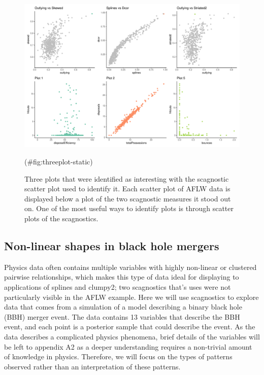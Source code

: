 \begin{Schunk}
\begin{figure}

{\centering \includegraphics[width=1\linewidth]{mason-lee-laa-cook_files/figure-latex/threeplot-static-1} 

}

\caption[Three plots that were identified as interesting with the scagnostic scatter plot used to identify it]{Three plots that were identified as interesting with the scagnostic scatter plot used to identify it. Each scatter plot of AFLW data is displayed below a plot of the two scagnostic measures it stood out on. One of the most useful ways to identify plots is through scatter plots of the scagnostics.}(\#fig:threeplot-static)
\end{figure}
\end{Schunk}

\hypertarget{non-linear-shapes-in-black-hole-mergers}{%
\subsection{Non-linear shapes in black hole
mergers}\label{non-linear-shapes-in-black-hole-mergers}}

Physics data often contains multiple variables with highly non-linear or
clustered pairwise relationships, which makes this type of data ideal
for displaying to applications of splines and clumpy2; two scagnostics
that's uses were not particularly visible in the AFLW example. Here we
will use scagnostics to explore data that comes from a simulation of a
model describing a binary black hole (BBH) merger event. The data
contains 13 variables that describe the BBH event, and each point is a
posterior sample that could describe the event. As the data describes a
complicated physics phenomena, brief details of the variables will be
left to appendix A2 as a deeper understanding requires a non-trivial
amount of knowledge in physics. Therefore, we will focus on the types of
patterns observed rather than an interpretation of these patterns.

